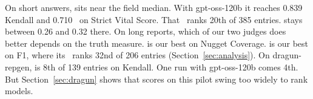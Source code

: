 On short answers,  sits near the field median. With
gpt-oss-120b it reaches 0.839 Kendall and 0.710 \tauap\ on Strict Vital Score.
That \tauap\ ranks 20th of 385 entries.  stays between 0.26 and
0.32 there. On long reports, which of our two judges does better depends on the
truth measure.  is our best on Nugget Coverage.
 is our best on F1, where its \tauap\ ranks 32nd of 206 entries
(Section~\ref{sec:analysis}). On dragun-repgen,  is 8th of 139
entries on Kendall. One  run with gpt-oss-120b comes 4th. But
Section~\ref{sec:dragun} shows that  scores on this pilot swing
too widely to rank models.

